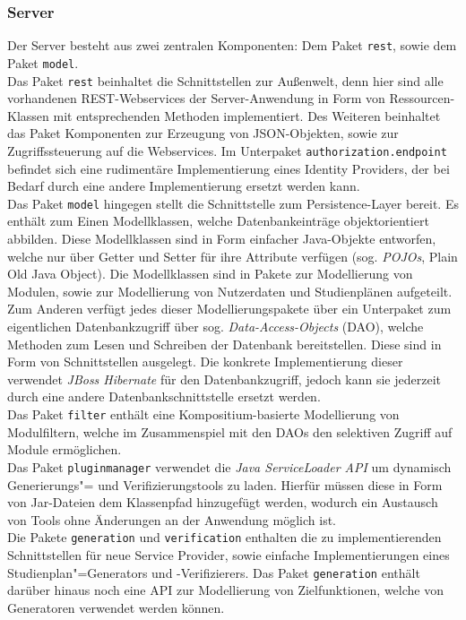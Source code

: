 \subsubsection{Server}
Der Server besteht aus zwei zentralen Komponenten: Dem Paket \texttt{rest}, sowie dem Paket \texttt{model}. \\
Das Paket \texttt{rest} beinhaltet die Schnittstellen zur Außenwelt, denn hier sind alle vorhandenen REST-Webservices der Server-Anwendung in Form von Ressourcen-Klassen mit entsprechenden Methoden implementiert. Des Weiteren beinhaltet das Paket Komponenten zur Erzeugung von JSON-Objekten, sowie zur Zugriffssteuerung auf die Webservices. Im Unterpaket \texttt{authorization.endpoint} befindet sich eine rudimentäre Implementierung eines Identity Providers, der bei Bedarf durch eine andere Implementierung ersetzt werden kann.\\
Das Paket \texttt{model} hingegen stellt die Schnittstelle zum Persistence-Layer bereit. Es enthält zum Einen Modellklassen, welche Datenbankeinträge objektorientiert abbilden. Diese Modellklassen sind in Form einfacher Java-Objekte entworfen, welche nur über Getter und Setter für ihre Attribute verfügen (sog. \emph{POJOs}, Plain Old Java Object). Die Modellklassen sind in Pakete zur Modellierung von Modulen, sowie zur Modellierung von Nutzerdaten und Studienplänen aufgeteilt. Zum Anderen verfügt jedes dieser Modellierungspakete über ein Unterpaket zum eigentlichen Datenbankzugriff über sog. \emph{Data-Access-Objects} (DAO), welche Methoden zum Lesen und Schreiben der Datenbank bereitstellen. Diese sind in Form von Schnittstellen ausgelegt. Die konkrete Implementierung dieser verwendet \emph{JBoss Hibernate} für den Datenbankzugriff, jedoch kann sie jederzeit durch eine andere Datenbankschnittstelle ersetzt werden.\\
Das Paket \texttt{filter} enthält eine Kompositium-basierte Modellierung von Modulfiltern, welche im Zusammenspiel mit den DAOs den selektiven Zugriff auf Module ermöglichen. \\
Das Paket \texttt{pluginmanager} verwendet die \emph{Java ServiceLoader API} um dynamisch Generierungs"= und Verifizierungstools zu laden. Hierfür müssen diese in Form von Jar-Dateien dem Klassenpfad hinzugefügt werden, wodurch ein Austausch von Tools ohne Änderungen an der Anwendung möglich ist. \\
Die Pakete \texttt{generation} und \texttt{verification} enthalten die zu implementierenden Schnittstellen für neue Service Provider, sowie einfache Implementierungen eines Studienplan"=Generators und -Verifizierers. Das Paket \texttt{generation} enthält darüber hinaus noch eine API zur Modellierung von Zielfunktionen, welche von Generatoren verwendet werden können.

